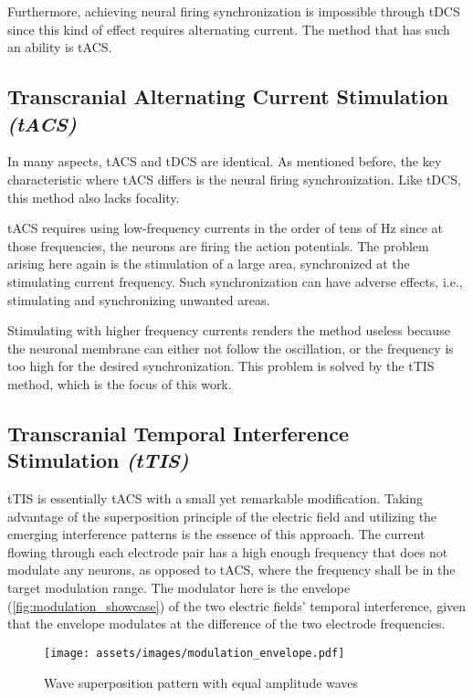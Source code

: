 Furthermore, achieving neural firing synchronization is impossible through \gls{tDCS} since this kind of effect requires alternating current. The method that has such an ability is \gls{tACS}.

\subsection{Transcranial Alternating Current Stimulation \textit{(tACS)}}

In many aspects, \gls{tACS} and \gls{tDCS} are identical. As mentioned before, the key characteristic where \gls{tACS} differs is the neural firing synchronization. Like \gls{tDCS}, this method also lacks focality.

\gls{tACS} requires using low-frequency currents in the order of tens of Hz since at those frequencies, the neurons are firing the action potentials. The problem arising here again is the stimulation of a large area, synchronized at the stimulating current frequency. Such synchronization can have adverse effects, i.e., stimulating and synchronizing unwanted areas.

Stimulating with higher frequency currents renders the method useless because the neuronal membrane can either not follow the oscillation, or the frequency is too high for the desired synchronization. This problem is solved by the \gls{tTIS} method, which is the focus of this work.

\subsection{Transcranial Temporal Interference Stimulation \textit{(tTIS)}}

\gls{tTIS} is essentially \gls{tACS} with a small yet remarkable modification. Taking advantage of the superposition principle of the electric field and utilizing the emerging interference patterns is the essence of this approach. The current flowing through each electrode pair has a high enough frequency that does not modulate any neurons, as opposed to \gls{tACS}, where the frequency shall be in the target modulation range. The modulator here is the envelope (\autoref{fig:modulation_showcase}) of the two electric fields' temporal interference, given that the envelope modulates at the difference of the two electrode frequencies.

\begin{figure}[H]
    \centering
    \texttt{[image: assets/images/modulation\_envelope.pdf]}
    \caption{Wave superposition pattern with equal amplitude waves}
    \label{fig:modulation_showcase}
\end{figure}

